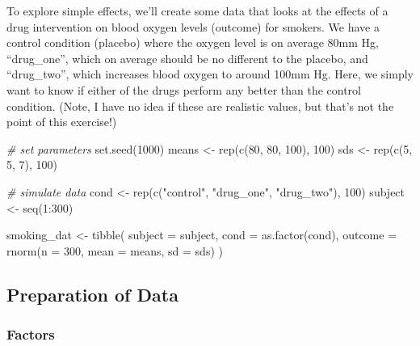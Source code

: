 \documentclass[
]{book}
\newenvironment{Shaded}{\begin{snugshade}}{\end{snugshade}}
\newcommand{\AttributeTok}[1]{\textcolor[rgb]{0.77,0.63,0.00}{#1}}
\newcommand{\CommentTok}[1]{\textcolor[rgb]{0.56,0.35,0.01}{\textit{#1}}}
\newcommand{\DecValTok}[1]{\textcolor[rgb]{0.00,0.00,0.81}{#1}}
\newcommand{\FunctionTok}[1]{\textcolor[rgb]{0.00,0.00,0.00}{#1}}
\newcommand{\NormalTok}[1]{#1}
\newcommand{\OtherTok}[1]{\textcolor[rgb]{0.56,0.35,0.01}{#1}}
\newcommand{\SpecialCharTok}[1]{\textcolor[rgb]{0.00,0.00,0.00}{#1}}
\newcommand{\StringTok}[1]{\textcolor[rgb]{0.31,0.60,0.02}{#1}}
\begin{document}
To explore simple effects, we'll create some data that looks at the effects of a drug intervention on blood oxygen levels (outcome) for smokers. We have a control condition (placebo) where the oxygen level is on average 80mm Hg, ``drug\_one'', which on average should be no different to the placebo, and ``drug\_two'', which increases blood oxygen to around 100mm Hg. Here, we simply want to know if either of the drugs perform any better than the control condition. (Note, I have no idea if these are realistic values, but that's not the point of this exercise!)

\begin{Shaded}
\begin{Highlighting}[]
\CommentTok{\# set parameters}
\FunctionTok{set.seed}\NormalTok{(}\DecValTok{1000}\NormalTok{)}
\NormalTok{means }\OtherTok{\textless{}{-}} \FunctionTok{rep}\NormalTok{(}\FunctionTok{c}\NormalTok{(}\DecValTok{80}\NormalTok{, }\DecValTok{80}\NormalTok{, }\DecValTok{100}\NormalTok{), }\DecValTok{100}\NormalTok{)}
\NormalTok{sds }\OtherTok{\textless{}{-}} \FunctionTok{rep}\NormalTok{(}\FunctionTok{c}\NormalTok{(}\DecValTok{5}\NormalTok{, }\DecValTok{5}\NormalTok{, }\DecValTok{7}\NormalTok{), }\DecValTok{100}\NormalTok{)}

\CommentTok{\# simulate data}
\NormalTok{cond }\OtherTok{\textless{}{-}} \FunctionTok{rep}\NormalTok{(}\FunctionTok{c}\NormalTok{(}\StringTok{"control"}\NormalTok{, }\StringTok{"drug\_one"}\NormalTok{, }\StringTok{"drug\_two"}\NormalTok{), }\DecValTok{100}\NormalTok{)}
\NormalTok{subject }\OtherTok{\textless{}{-}} \FunctionTok{seq}\NormalTok{(}\DecValTok{1}\SpecialCharTok{:}\DecValTok{300}\NormalTok{)}

\NormalTok{smoking\_dat }\OtherTok{\textless{}{-}} \FunctionTok{tibble}\NormalTok{(}
  \AttributeTok{subject =}\NormalTok{ subject,}
  \AttributeTok{cond =} \FunctionTok{as.factor}\NormalTok{(cond),}
  \AttributeTok{outcome =} \FunctionTok{rnorm}\NormalTok{(}\AttributeTok{n =} \DecValTok{300}\NormalTok{, }\AttributeTok{mean =}\NormalTok{ means, }\AttributeTok{sd =}\NormalTok{ sds)}
\NormalTok{)}
\end{Highlighting}
\end{Shaded}

\hypertarget{preparation-of-data}{%
\subsection{Preparation of Data}\label{preparation-of-data}}

\hypertarget{factors}{%
\subsubsection{Factors}\label{factors}}
\end{document}
